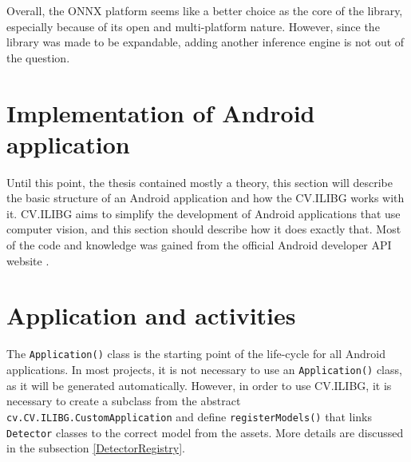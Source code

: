 Overall, the ONNX platform seems like a better choice as the core of the library, especially because of its open and multi-platform nature. However, since the library was made to be expandable, adding another inference engine is not out of the question.



\section{Implementation of Android application}
Until this point, the thesis contained mostly a theory, this section will describe the basic structure of an Android application and how the CV.ILIBG works with it. CV.ILIBG aims to simplify the development of Android applications that use computer vision, and this section should describe how it does exactly that. Most of the code and knowledge was gained from the official Android developer API website \cite{androiddev}.



\section{Application and activities}
\label{applicationClass}

The \texttt{Application()} class is the starting point of the life-cycle for all Android applications. In most projects, it is not necessary to use an \texttt{Application()} class, as it will be generated automatically. However, in order to use CV.ILIBG, it is necessary to create a subclass from the abstract \texttt{cv.CV.ILIBG.CustomApplication} and define \texttt{registerModels()} that links \texttt{Detector} classes to the correct model from the assets. More details are discussed in the subsection \ref{DetectorRegistry}.



